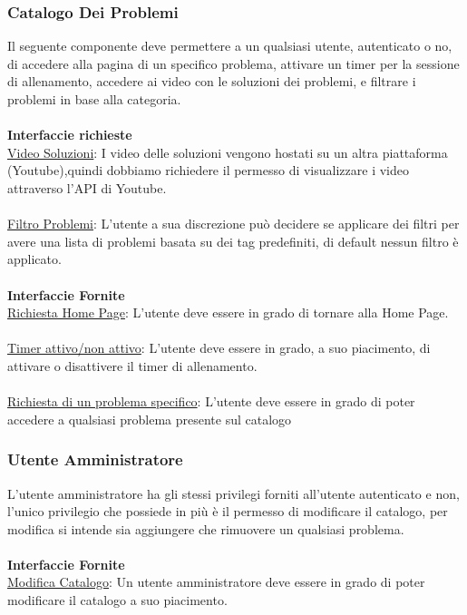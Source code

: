 \documentclass[11pt, a4paper]{article}
\theoremstyle{definition} %
\begin{document}
\subsubsection{Catalogo Dei Problemi}
Il seguente componente deve permettere a un qualsiasi utente, autenticato o no, di accedere alla pagina di un specifico problema, attivare un timer per la sessione di allenamento,
accedere ai video con le soluzioni dei problemi, e filtrare i problemi in base alla categoria.
\\\\\textbf{Interfaccie richieste}\\
\underline{Video Soluzioni}: I video delle soluzioni vengono hostati su un altra piattaforma (Youtube),quindi dobbiamo richiedere il permesso di visualizzare i video attraverso l'API di Youtube.
\\\\
\underline{Filtro Problemi}: L'utente a sua discrezione può decidere se applicare dei filtri per avere una lista di problemi basata su dei tag predefiniti, di default nessun filtro è applicato.
\\\\
\textbf{Interfaccie Fornite}
\\
\underline{Richiesta Home Page}: L'utente deve essere in grado di tornare alla Home Page.
\\\\
\underline{Timer attivo/non attivo}: L'utente deve essere in grado, a suo piacimento, di attivare o disattivere il timer di allenamento.
\\\\
\underline{Richiesta di un problema specifico}: L'utente deve essere in grado di poter accedere a qualsiasi problema presente sul catalogo

\subsubsection{Utente Amministratore}
L'utente amministratore ha gli stessi privilegi forniti all'utente autenticato e non, l'unico privilegio che possiede in più è il permesso di modificare il catalogo,
per modifica si intende sia aggiungere che rimuovere un qualsiasi problema.
\\\\\textbf{Interfaccie Fornite}\\
\underline{Modifica Catalogo}: Un utente amministratore deve essere in grado di poter modificare il catalogo a suo piacimento.
\end{document}
